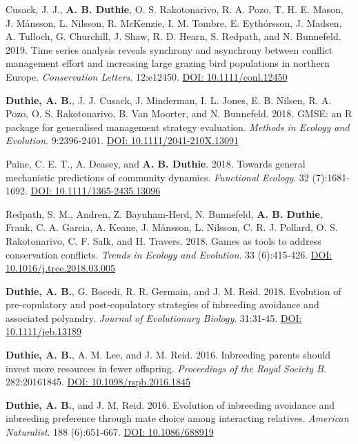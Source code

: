\documentclass[letterpaper]{article}
\begin{document}
\begin{etaremune}
\item Cusack, J. J., {\bf A. B. Duthie}, O. S. Rakotonarivo, R. A. Pozo, T. H. E. Mason, J. M\r{a}nsson, L. Nilsson, R. McKenzie, I. M. Tombre, E. Eyth\'{o}rsson, J. Madsen, A. Tulloch, G. Churchill, J. Shaw, R. D. Hearn, S. Redpath, and N. Bunnefeld. 2019. Time series analysis reveals synchrony and asynchrony between conflict management effort and increasing large grazing bird populations in northern Europe. {\it Conservation Letters}. 12:e12450. \href{http://onlinelibrary.wiley.com/doi/10.1111/conl.12450/full}{DOI: 10.1111/conl.12450}
\item {\bf Duthie, A. B.}, J. J. Cusack, J. Minderman, I. L. Jones, E. B. Nilsen, R. A. Pozo, O. S. Rakotonarivo, B. Van Moorter, and N. Bunnefeld. 2018. GMSE: an R package for generalised management strategy evaluation. {\it Methods in Ecology and Evolution}. 9:2396-2401. \href{https://besjournals.onlinelibrary.wiley.com/doi/10.1111/2041-210X.13091}{DOI: 10.1111/2041-210X.13091} 
\item Paine, C. E. T., A. Deasey, and {\bf A. B. Duthie}. 2018. Towards general mechanistic predictions of community dynamics. {\it Functional Ecology}. 32 (7):1681-1692. \href{http://onlinelibrary.wiley.com/doi/10.1111/1365-2435.13096/pdf}{DOI: 10.1111/1365-2435.13096}
\item Redpath, S. M., Andren, Z. Baynham-Herd, N. Bunnefeld, {\bf A. B. Duthie}, Frank, C. A. Garcia, A. Keane, J. M\r{a}nsson, L. Nilsson, C. R. J. Pollard, O. S. Rakotonarivo, C. F. Salk, and H. Travers. 2018. Games as tools to address conservation conflicts. {\it Trends in Ecology and Evolution}. 33 (6):415-426. \href{https://www.cell.com/trends/ecology-evolution/fulltext/S0169-5347(18)30059-4}{DOI: 10.1016/j.tree.2018.03.005}
\item {\bf Duthie, A. B.}, G. Bocedi, R. R. Germain, and J. M. Reid. 2018. Evolution of pre-copulatory and post-copulatory strategies of inbreeding avoidance and associated polyandry. {\it Journal of Evolutionary Biology}. 31:31-45. \href{https://onlinelibrary.wiley.com/doi/10.1111/jeb.13189/full}{DOI: 10.1111/jeb.13189}
\item {\bf Duthie, A. B.}, A. M. Lee, and J. M. Reid. 2016. Inbreeding parents should invest more resources in fewer offspring. {\it Proceedings of the Royal Society B}. 282:20161845. \href{http://rspb.royalsocietypublishing.org/content/283/1843/20161845}{DOI: 10.1098/rspb.2016.1845}
\item {\bf Duthie, A. B.}, and J. M. Reid. 2016. Evolution of inbreeding avoidance and inbreeding preference through mate choice among interacting relatives. {\it American Naturalist}. 188 (6):651-667. \href{http://www.journals.uchicago.edu/doi/full/10.1086/688919}{DOI: 10.1086/688919}

\end{etaremune}
\end{document}
